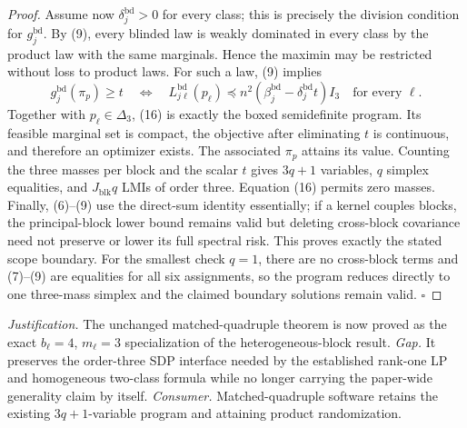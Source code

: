 \documentclass{article}
\begin{document}
\begin{proof}
Assume now \(\delta_j^{\mathrm{bd}}>0\) for every class; this is precisely the division condition for \(g_j^{\mathrm{bd}}\).  By (9), every blinded law is weakly dominated in every class by the product law with the same marginals.  Hence the maximin may be restricted without loss to product laws.  For such a law, (9) implies
\[
g_j^{\mathrm{bd}}(\pi_p)\ge t
\quad\Longleftrightarrow\quad
L_{j\ell}^{\mathrm{bd}}(p_\ell)
\preceq n^2(\beta_j^{\mathrm{bd}}-\delta_j^{\mathrm{bd}}t)I_3
\quad\text{for every }\ell. \tag{16}
\]
Together with \(p_\ell\in\Delta_3\), (16) is exactly the boxed semidefinite program.  Its feasible marginal set is compact, the objective after eliminating \(t\) is continuous, and therefore an optimizer exists.  The associated \(\pi_p\) attains its value.  Counting the three masses per block and the scalar \(t\) gives \(3q+1\) variables, \(q\) simplex equalities, and \(J_{\mathrm{blk}}q\) LMIs of order three.  Equation (16) permits zero masses.  Finally, (6)--(9) use the direct-sum identity essentially; if a kernel couples blocks, the principal-block lower bound remains valid but deleting cross-block covariance need not preserve or lower its full spectral risk.  This proves exactly the stated scope boundary.  For the smallest check \(q=1\), there are no cross-block terms and (7)--(9) are equalities for all six assignments, so the program reduces directly to one three-mass simplex and the claimed boundary solutions remain valid. \(\square\)
\end{proof}
\par\smallskip\noindent \textit{Justification.} The unchanged matched-quadruple theorem is now proved as the exact \(b_\ell=4\), \(m_\ell=3\) specialization of the heterogeneous-block result. \textit{Gap.} It preserves the order-three SDP interface needed by the established rank-one LP and homogeneous two-class formula while no longer carrying the paper-wide generality claim by itself. \textit{Consumer.} Matched-quadruple software retains the existing \(3q+1\)-variable program and attaining product randomization.
\end{document}

